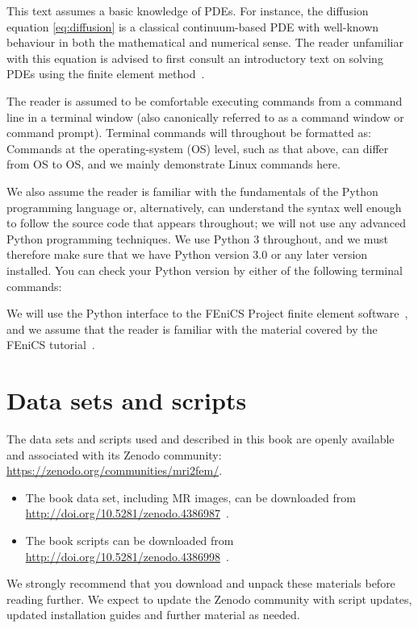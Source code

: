 This text assumes a basic knowledge of PDEs. For instance, the
diffusion equation \eqref{eq:diffusion} is a classical continuum-based
PDE with well-known behaviour in both the mathematical and numerical
sense. The reader unfamiliar with this equation is advised to first
consult an introductory text on solving PDEs using the finite element
method~\cite{tveito2004introduction, gockenbach2006understanding,
  langtangen2016solving, langtangen2019introduction}.

The reader is assumed to be comfortable executing commands from a
command line in a terminal window (also canonically referred
to as a command window or command prompt). Terminal commands
will throughout be formatted as:
\noindent Commands at the operating-system (OS) level, such as that above,
can differ from OS to OS, and we mainly demonstrate Linux commands
here.

We also assume the reader is familiar with the fundamentals of the
Python programming language or, alternatively, can understand the
syntax well enough to follow the source code that appears throughout;
we will not use any advanced Python programming techniques. We use
Python 3 throughout, and we must therefore make sure that we have Python
version 3.0 or any later version installed. You can check
your Python version by either of the following terminal commands:

We will use the Python interface to the FEniCS Project finite
element software~\cite{alnaes2015fenics}, and we assume that the
reader is familiar with the material covered by the FEniCS
tutorial~\cite{langtangen2016solving}.

\section{Data sets and scripts}


The data sets and scripts used and described in this book are openly
available and associated with its Zenodo community:
\url{https://zenodo.org/communities/mri2fem/}. 
\begin{itemize}
\item
  The book data set, including MR images, can be downloaded from \\
  \url{http://doi.org/10.5281/zenodo.4386987}~\cite{kent_andre_mardal_2020_4386987}.
\item
  The book scripts can be downloaded from \\
  \url{http://doi.org/10.5281/zenodo.4386998}~\cite{kent_andre_mardal_2020_4386999}.
\end{itemize}
We strongly recommend that you download and unpack these materials
before reading further. We expect to update the Zenodo community with
script updates, updated installation guides and further material as
needed.
 
